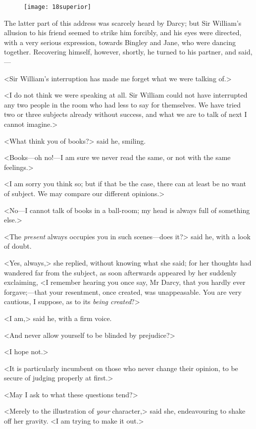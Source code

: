 \begin{figure}[tbh]
\centering
\texttt{[image: 18superior]}
\end{figure}

The latter part of this address was scarcely heard by Darcy; but Sir William's allusion to his friend seemed to strike him forcibly, and his eyes were directed, with a very serious expression, towards Bingley and Jane, who were dancing together. Recovering himself, however, shortly, he turned to his partner, and said,—

<Sir William's interruption has made me forget what we were talking of.>

<I do not think we were speaking at all. Sir William could not have interrupted any two people in the room who had less to say for themselves. We have tried two or three subjects already without success, and what we are to talk of next I cannot imagine.>

<What think you of books?> said he, smiling.

<Books—oh no!—I am sure we never read the same, or not with the same feelings.>

<I am sorry you think so; but if that be the case, there can at least be no want of subject. We may compare our different opinions.>

<No—I cannot talk of books in a ball-room; my head is always full of something else.>

<The \textit{present} always occupies you in such scenes—does it?> said he, with a look of doubt.

<Yes, always,> she replied, without knowing what she said; for her thoughts had wandered far from the subject, as soon afterwards appeared by her suddenly exclaiming, <I remember hearing you once say, Mr Darcy, that you hardly ever forgave;—that your resentment, once created, was unappeasable. You are very cautious, I suppose, as to its \textit{being created}?>

<I am,> said he, with a firm voice.

<And never allow yourself to be blinded by prejudice?>

<I hope not.>

<It is particularly incumbent on those who never change their opinion, to be secure of judging properly at first.>

<May I ask to what these questions tend?>

<Merely to the illustration of \textit{your} character,> said she, endeavouring to shake off her gravity. <I am trying to make it out.>


